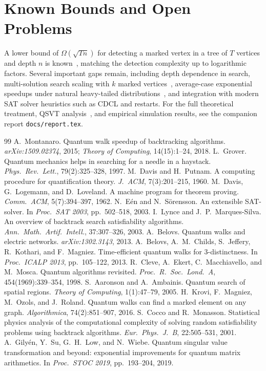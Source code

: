 \documentclass[11pt,a4paper]{article}
\begin{document}
\section{Known Bounds and Open Problems}

A lower bound of $\Omega(\sqrt{Tn})$ for detecting a marked vertex in a tree of $T$ vertices and depth $n$ is known~\cite{aaronson2005}, matching the detection complexity up to logarithmic factors. Several important gaps remain, including depth dependence in search, multi-solution search scaling with $k$ marked vertices~\cite{krovi2015}, average-case exponential speedups under natural heavy-tailed distributions~\cite{cocco2001}, and integration with modern SAT solver heuristics such as CDCL and restarts. For the full theoretical treatment, QSVT analysis~\cite{gilyen2019}, and empirical simulation results, see the companion report \texttt{docs/report.tex}.

\begin{thebibliography}{99}
 A.~Montanaro. Quantum walk speedup of backtracking algorithms. \emph{arXiv:1509.02374}, 2015; \emph{Theory of Computing}, 14(15):1--24, 2018.
 L.~Grover. Quantum mechanics helps in searching for a needle in a haystack. \emph{Phys.\ Rev.\ Lett.}, 79(2):325--328, 1997.
 M.~Davis and H.~Putnam. A computing procedure for quantification theory. \emph{J.\ ACM}, 7(3):201--215, 1960.
 M.~Davis, G.~Logemann, and D.~Loveland. A machine program for theorem proving. \emph{Comm.\ ACM}, 5(7):394--397, 1962.
 N.~E\'{e}n and N.~S\"{o}rensson. An extensible SAT-solver. In \emph{Proc.\ SAT 2003}, pp.\ 502--518, 2003.
 I.~Lynce and J.~P.~Marques-Silva. An overview of backtrack search satisfiability algorithms. \emph{Ann.\ Math.\ Artif.\ Intell.}, 37:307--326, 2003.
 A.~Belovs. Quantum walks and electric networks. \emph{arXiv:1302.3143}, 2013.
 A.~Belovs, A.~M.~Childs, S.~Jeffery, R.~Kothari, and F.~Magniez. Time-efficient quantum walks for 3-distinctness. In \emph{Proc.\ ICALP 2013}, pp.\ 105--122, 2013.
 R.~Cleve, A.~Ekert, C.~Macchiavello, and M.~Mosca. Quantum algorithms revisited. \emph{Proc.\ R.\ Soc.\ Lond.\ A}, 454(1969):339--354, 1998.
 S.~Aaronson and A.~Ambainis. Quantum search of spatial regions. \emph{Theory of Computing}, 1(1):47--79, 2005.
 H.~Krovi, F.~Magniez, M.~Ozols, and J.~Roland. Quantum walks can find a marked element on any graph. \emph{Algorithmica}, 74(2):851--907, 2016.
 S.~Cocco and R.~Monasson. Statistical physics analysis of the computational complexity of solving random satisfiability problems using backtrack algorithms. \emph{Eur.\ Phys.\ J.\ B}, 22:505--531, 2001.
 A.~Gily\'{e}n, Y.~Su, G.~H.~Low, and N.~Wiebe. Quantum singular value transformation and beyond: exponential improvements for quantum matrix arithmetics. In \emph{Proc.\ STOC 2019}, pp.\ 193--204, 2019.
\end{thebibliography}
\end{document}
